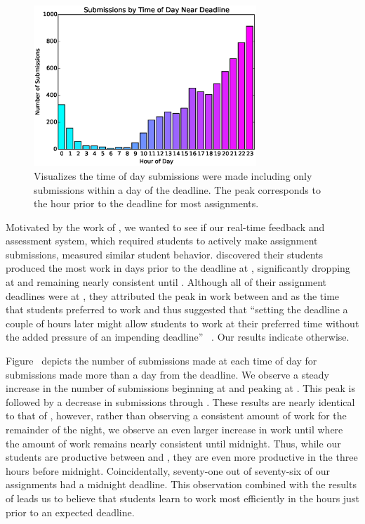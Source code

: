 \begin{figure}[!t]
\centering
\includegraphics[width=3.3in]{graphs/Submissions_by_Time_of_Day_Near_Deadline.eps}
\caption{Visualizes the time of day submissions were made including only
  submissions within a day of the deadline. The  peak corresponds to the
  hour prior to the deadline for most assignments.}
\end{figure}

Motivated by the work of \spacco{}, we wanted to see if our real-time feedback
and assessment system, which required students to actively make assignment
submissions, measured similar student behavior. \spacco{} discovered their
students produced the most work in days prior to the deadline at ,
significantly dropping at  and remaining nearly consistent until
. Although all of their assignment deadlines were at , they
attributed the peak in work between  and  as the time that students
preferred to work and thus suggested that ``setting the deadline a couple of
hours later might allow students to work at their preferred time without the
added pressure of an impending deadline''
~\cite{Spacco:2013:TIP:2462476.2465594}. Our results indicate otherwise.

Figure~ depicts the number of submissions made at
each time of day for submissions made more than a day from the deadline. We
observe a steady increase in the number of submissions beginning at  and
peaking at . This peak is followed by a decrease in submissions through
. These results are nearly identical to that of \spacco{}, however,
rather than observing a consistent amount of work for the remainder of the
night, we observe an even larger increase in work until  where the amount
of work remains nearly consistent until midnight. Thus, while our students are
productive between  and , they are even more productive in the
three hours before midnight. Coincidentally, seventy-one out of seventy-six of
our assignments had a midnight deadline. This observation combined with the
results of \spacco{} leads us to believe that students learn to work most
efficiently in the hours just prior to an expected deadline.

